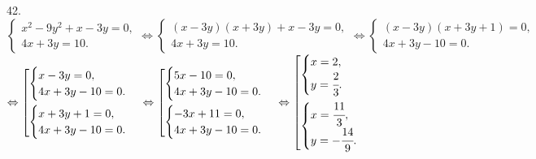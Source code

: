 42. $\begin{cases}
x^2-9y^2+x-3y=0,\\
4x+3y=10.
\end{cases}\Leftrightarrow\begin{cases}
(x-3y)(x+3y)+x-3y=0,\\
4x+3y=10.
\end{cases}\Leftrightarrow\begin{cases}
(x-3y)(x+3y+1)=0,\\
4x+3y-10=0.
\end{cases}$\\$\Leftrightarrow \left[
      \begin{gathered} \begin{cases}x-3y=0,\\4x+3y-10=0.\end{cases}\hfill\\
      \begin{cases}x+3y+1=0,\\4x+3y-10=0.\end{cases}\hfill \end{gathered}\right.\Leftrightarrow \left[
      \begin{gathered} \begin{cases}5x-10=0,\\4x+3y-10=0.\end{cases}\hfill\\
      \begin{cases}-3x+11=0,\\4x+3y-10=0.\end{cases}\hfill \end{gathered}\right.\Leftrightarrow \left[
      \begin{gathered} \begin{cases}x=2,\\y=\cfrac{2}{3}.\end{cases}\hfill\\
      \begin{cases}x=\cfrac{11}{3},\\y=-\cfrac{14}{9}.\end{cases}\hfill \end{gathered}\right.$\\
